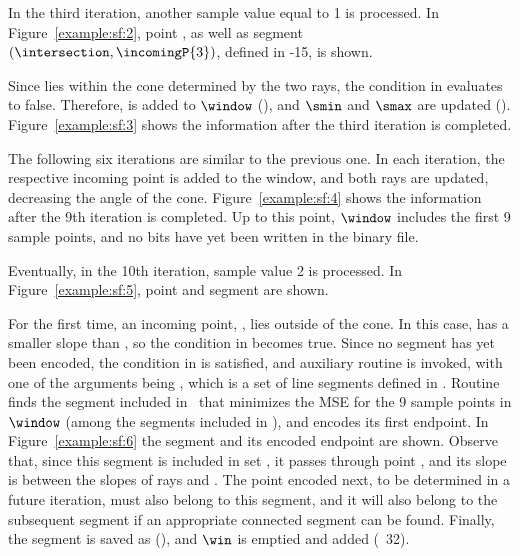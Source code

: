 \vspace{+5pt}


In the third iteration, another sample value equal to 1 is processed. In Figure~\ref{example:sf:2}, point , as well as segment $(\intersection,\incomingP{3})$, defined in -15, is shown.


\vspace{+5pt}


\clearpage


Since  lies within the cone determined by the two rays, the condition in  evaluates to false. Therefore,  is added to $\window$ (), and $\smin$ and $\smax$ are updated (). Figure~\ref{example:sf:3} shows the information after the third iteration is completed. 


\vspace{+5pt}


The following six iterations are similar to the previous one. In each iteration, the respective incoming point is added to the window, and both rays are updated, decreasing the angle of the cone. Figure~\ref{example:sf:4} shows the information after the 9th iteration is completed. Up to this point, $\window$ includes the first 9 sample points, and no bits have yet been written in the binary file. 


\vspace{+5pt}


\clearpage


Eventually, in the 10th iteration, sample value 2 is processed. In Figure~\ref{example:sf:5}, point  and segment  are shown.




For the first time, an incoming point, , lies outside of the cone. In this case,  has a smaller slope than \smin, so the condition in  becomes true. Since no segment has yet been encoded, the condition in  is satisfied, and auxiliary routine \SFWinStart is invoked, with one of the arguments being \segmentSet, which is a set of line segments defined in . Routine \SFWinStart finds the segment included in \segmentSet\ that minimizes the MSE for the 9 sample points in $\window$ (among the segments included in \segmentSet), and encodes its first endpoint. In Figure~\ref{example:sf:6} the segment and its encoded endpoint are shown. Observe that, since this segment is included in set \segmentSet, it passes through point \interPoint, and its slope is between the slopes of rays \smin and \smax. The point encoded next, to be determined in a future iteration, must also belong to this segment, and it will also belong to the subsequent segment if an appropriate connected segment can be found. Finally, the segment is saved as \segmentLastT (), and $\win$ is emptied and added  (\Line~32).


